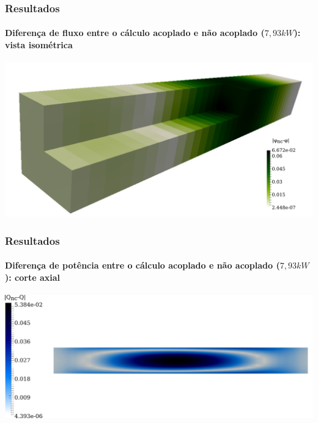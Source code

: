 \documentclass[svgnames,smaller,table]{beamer}
\begin{document}
\begin{frame}
  \frametitle{Resultados}
  \framesubtitle{Diferença de fluxo entre o cálculo acoplado e não acoplado ($7,93 kW$): vista isométrica}
  \centering\includegraphics[scale=0.4]{../figuras/diff-flux-isometrico.png}
\end{frame}

\begin{frame}
  \frametitle{Resultados}
  \framesubtitle{Diferença de potência entre o cálculo acoplado e não acoplado ($7,93 kW$): corte axial}
  \centering\includegraphics[scale=0.5]{../figuras/diff-q-axial.png}
\end{frame}
\end{document}
